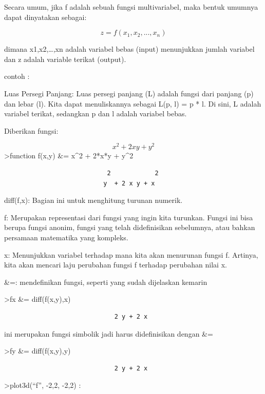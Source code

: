\documentclass[
]{book}
\begin{document}
Secara umum, jika f adalah sebuah fungsi multivariabel, maka bentuk umumnya dapat dinyatakan sebagai:

\[z=f(x_1,x_2,...,x_n)\]

dimana x1,x2,\ldots,xn adalah variabel bebas (input) menunjukkan jumlah variabel dan z adalah variable terikat (output).

contoh :

Luas Persegi Panjang: Luas persegi panjang (L) adalah fungsi dari panjang (p) dan lebar (l). Kita dapat menuliskannya sebagai L(p, l) = p * l. Di sini, L adalah variabel terikat, sedangkan p dan l adalah variabel bebas.

Diberikan fungsi:

\[x^2+2xy+y^2\]\textgreater function f(x,y) \&= x\^{}2 + 2*x*y + y\^{}2

\begin{verbatim}
                            2            2
                           y  + 2 x y + x
\end{verbatim}

diff(f,x): Bagian ini untuk menghitung turunan numerik.

f: Merupakan representasi dari fungsi yang ingin kita turunkan. Fungsi ini bisa berupa fungsi anonim, fungsi yang telah didefinisikan sebelumnya, atau bahkan persamaan matematika yang kompleks.

x: Menunjukkan variabel terhadap mana kita akan menurunan fungsi f. Artinya, kita akan mencari laju perubahan fungsi f terhadap perubahan nilai x.

\&=: mendefinikan fungsi, seperti yang sudah dijelaskan kemarin

\textgreater fx \&= diff(f(x,y),x)

\begin{verbatim}
                              2 y + 2 x
\end{verbatim}

ini merupakan fungsi simbolik jadi harus didefinisikan dengan \&=

\textgreater fy \&= diff(f(x,y),y)

\begin{verbatim}
                              2 y + 2 x
\end{verbatim}

\textgreater plot3d(``f'', -2,2, -2,2) :
\end{document}
